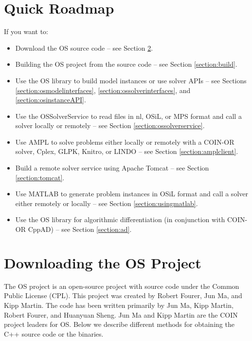 \documentclass[11pt]{article}
\renewcommand{\_}{{\char"5F}}
\renewcommand{\{}{{\char"7B}}
\renewcommand{\}}{{\char"7D}}
\renewcommand{\^}{{\char"0D}}
\renewcommand{\'}{{\char"0D}}
\begin{document}
\section{Quick Roadmap}\label{section:roadmap}

If you want to:

\begin{itemize}
\item Download  the OS source code -- see Section \ref{section:download}.


\item Building the OS project from the source code -- see Section \ref{section:build}.

\item Use the OS library to build model instances or use solver APIs -- see Sections  \ref{section:osmodelinterfaces},  \ref{section:ossolverinterfaces}, and \ref{section:osinstanceAPI}.

\item Use the OSSolverService to read files in nl, OSiL, or MPS format and call a solver locally or remotely -- see Section \ref{section:ossolverservice}.


\item Use AMPL to solve problems either locally or remotely with a COIN-OR solver, Cplex, GLPK, Knitro, or LINDO -- see Section \ref{section:amplclient}. 


\item Build a remote solver service using Apache Tomcat -- see Section \ref{section:tomcat}.

\item Use MATLAB to generate problem instances in OSiL format and call a solver either remotely or locally -- see Section \ref{section:usingmatlab}.

\item Use the OS library for algorithmic differentiation (in conjunction with COIN-OR CppAD) -- see Section \ref{section:ad}.
\end{itemize}





\section{Downloading the OS Project}\label{section:download}

The OS project is an open-source project  with source code under the Common Public License (CPL). This project was created by Robert Fourer, Jun Ma, and Kipp Martin. The code has been written primarily by Jun Ma, Kipp Martin, Robert Fourer, and Huanyuan Sheng.  Jun Ma and Kipp Martin are the COIN project leaders for OS.    Below we describe different methods for obtaining the C++ source code or the binaries. 
\end{document}
